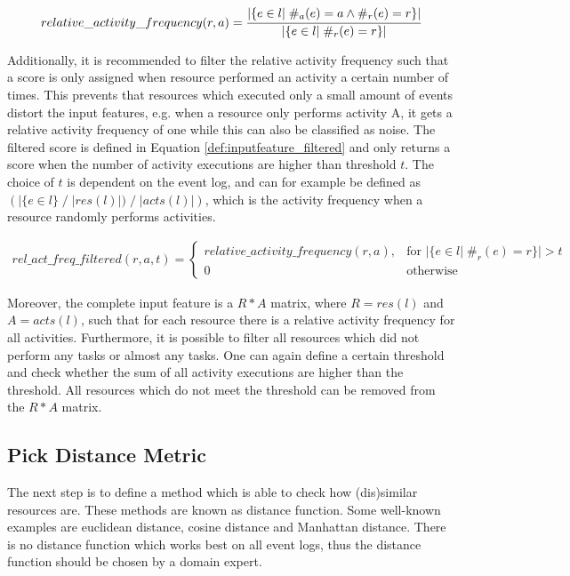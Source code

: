 \begin{equation}\label{def:inputfeature}
  \begin{array}{l}
    relative\_activity\_frequency(r,a) =  
    \cfrac{| \{e \in l | \; \#_{a}(e) = a \wedge \#_r(e)=r\}|}
    {| \{e \in l | \; \#_r(e)=r\}|}
  \end{array}
\end{equation}

Additionally, it is recommended to filter the relative activity frequency such that a score is only assigned when resource performed an activity a certain number of times. This prevents that resources which executed only a small amount of events distort the input features, e.g. when a resource only performs activity A, it gets a relative activity frequency of one while this can also be classified as noise. The filtered score is defined in Equation \ref{def:inputfeature_filtered} and only returns a score when the number of activity executions are higher than threshold $t$. The choice of $t$ is dependent on the event log, and can for example be defined as $(|\{e \in l\} \; / \; |res(l)|) \; / \; |acts(l)|)$, which is the activity frequency when a resource randomly performs activities. 


\begin{equation}\label{def:inputfeature_filtered}
  \begin{array}{l}
    rel\_act\_freq\_filtered(r, a, t) = 
    
    \begin{cases}
    	relative\_activity\_frequency(r,a), & \text{for } | \{e \in l | \; \#_r(e)=r\}| > t\\
        0 & \text{otherwise}
    \end{cases}
  \end{array}
\end{equation}

Moreover, the complete input feature is a $R  *  A$ matrix, where $R = res(l)$ and $A = acts(l)$, such that for each resource there is a relative activity frequency for all activities. Furthermore, it is possible to filter all resources which did not perform any tasks or almost any tasks. One can again define a certain threshold and check whether the sum of all activity executions are higher than the threshold. All resources which do not meet the threshold can be removed from the $R  *  A$ matrix.

\subsection{Pick Distance Metric}
The next step is to define a method which is able to check how (dis)similar resources are. These methods are known as distance function. Some well-known examples are euclidean distance, cosine distance and Manhattan distance. There is no distance function which works best on all event logs, thus the distance function should be chosen by a domain expert. 

